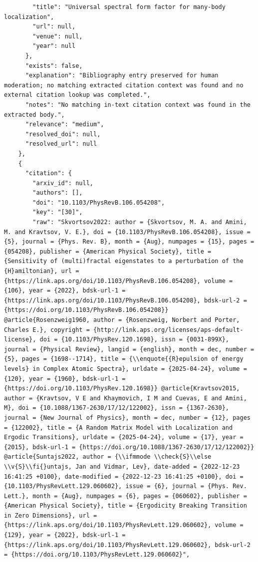 \documentclass[11pt]{article}
\begin{document}
\begin{verbatim}
        "title": "Universal spectral form factor for many-body localization",
        "url": null,
        "venue": null,
        "year": null
      },
      "exists": false,
      "explanation": "Bibliography entry preserved for human moderation; no matching extracted citation context was found and no external citation lookup was completed.",
      "notes": "No matching in-text citation context was found in the extracted body.",
      "relevance": "medium",
      "resolved_doi": null,
      "resolved_url": null
    },
    {
      "citation": {
        "arxiv_id": null,
        "authors": [],
        "doi": "10.1103/PhysRevB.106.054208",
        "key": "[30]",
        "raw": "Skvortsov2022: author = {Skvortsov, M. A. and Amini, M. and Kravtsov, V. E.}, doi = {10.1103/PhysRevB.106.054208}, issue = {5}, journal = {Phys. Rev. B}, month = {Aug}, numpages = {15}, pages = {054208}, publisher = {American Physical Society}, title = {Sensitivity of (multi)fractal eigenstates to a perturbation of the {H}amiltonian}, url = {https://link.aps.org/doi/10.1103/PhysRevB.106.054208}, volume = {106}, year = {2022}, bdsk-url-1 = {https://link.aps.org/doi/10.1103/PhysRevB.106.054208}, bdsk-url-2 = {https://doi.org/10.1103/PhysRevB.106.054208}} @article{Rosenzweig1960, author = {Rosenzweig, Norbert and Porter, Charles E.}, copyright = {http://link.aps.org/licenses/aps-default-license}, doi = {10.1103/PhysRev.120.1698}, issn = {0031-899X}, journal = {Physical Review}, langid = {english}, month = dec, number = {5}, pages = {1698--1714}, title = {\\enquote{{R}epulsion of energy levels} in Complex Atomic Spectra}, urldate = {2025-04-24}, volume = {120}, year = {1960}, bdsk-url-1 = {https://doi.org/10.1103/PhysRev.120.1698}} @article{Kravtsov2015, author = {Kravtsov, V E and Khaymovich, I M and Cuevas, E and Amini, M}, doi = {10.1088/1367-2630/17/12/122002}, issn = {1367-2630}, journal = {New Journal of Physics}, month = dec, number = {12}, pages = {122002}, title = {A Random Matrix Model with Localization and Ergodic Transitions}, urldate = {2025-04-24}, volume = {17}, year = {2015}, bdsk-url-1 = {https://doi.org/10.1088/1367-2630/17/12/122002}} @article{Suntajs2022, author = {\\ifmmode \\check{S}\\else \\v{S}\\fi{}untajs, Jan and Vidmar, Lev}, date-added = {2022-12-23 16:41:25 +0100}, date-modified = {2022-12-23 16:41:25 +0100}, doi = {10.1103/PhysRevLett.129.060602}, issue = {6}, journal = {Phys. Rev. Lett.}, month = {Aug}, numpages = {6}, pages = {060602}, publisher = {American Physical Society}, title = {Ergodicity Breaking Transition in Zero Dimensions}, url = {https://link.aps.org/doi/10.1103/PhysRevLett.129.060602}, volume = {129}, year = {2022}, bdsk-url-1 = {https://link.aps.org/doi/10.1103/PhysRevLett.129.060602}, bdsk-url-2 = {https://doi.org/10.1103/PhysRevLett.129.060602}",

\end{verbatim}
\end{document}
